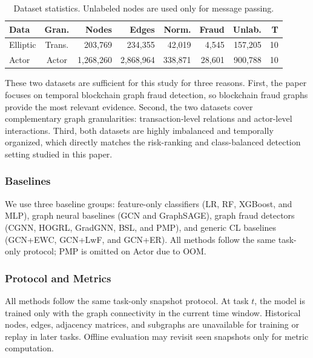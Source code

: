 \begin{table}[!htbp]
  \centering
  \caption{Dataset statistics. Unlabeled nodes are used only for message passing.}
  \label{tab:dataset-statistics}
  \scriptsize
  \setlength{\tabcolsep}{1.8pt}
  \begin{tabular*}{\columnwidth}{@{\extracolsep{\fill}}lcrrrrrr@{}}
    \toprule
    Data & Gran. & Nodes & Edges & Norm. & Fraud & Unlab. & T \\
    \midrule
    Elliptic & Trans. & 203,769 & 234,355 & 42,019 & 4,545 & 157,205 & 10 \\
    Actor & Actor & 1,268,260 & 2,868,964 & 338,871 & 28,601 & 900,788 & 10 \\
    \bottomrule
  \end{tabular*}
\end{table}
\FloatBarrier

These two datasets are sufficient for this study for three reasons. First, the paper focuses on temporal blockchain graph fraud detection, so blockchain fraud graphs provide the most relevant evidence. Second, the two datasets cover complementary graph granularities: transaction-level relations and actor-level interactions. Third, both datasets are highly imbalanced and temporally organized, which directly matches the risk-ranking and class-balanced detection setting studied in this paper.

\subsubsection{Baselines}
\label{subsubsec:baselines}

We use three baseline groups: feature-only classifiers (LR, RF, XGBoost, and MLP), graph neural baselines (GCN and GraphSAGE), graph fraud detectors (CGNN, HOGRL, GradGNN, BSL, and PMP), and generic CL baselines (GCN+EWC, GCN+LwF, and GCN+ER). All methods follow the same task-only protocol; PMP is omitted on Actor due to OOM.

\subsubsection{Protocol and Metrics}
\label{subsubsec:metrics-protocol}

All methods follow the same task-only snapshot protocol. At task $t$, the model is trained only with the graph connectivity in the current time window. Historical nodes, edges, adjacency matrices, and subgraphs are unavailable for training or replay in later tasks. Offline evaluation may revisit seen snapshots only for metric computation.

